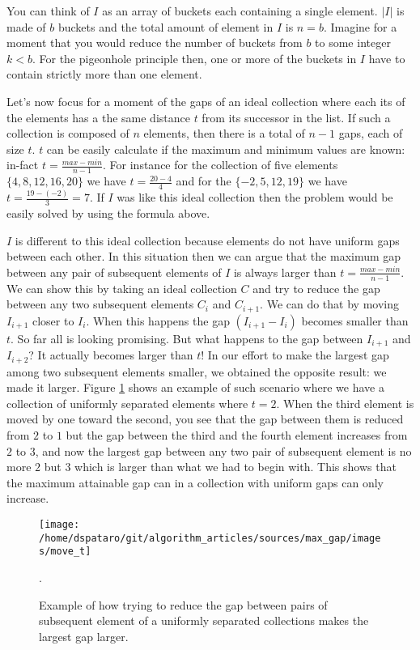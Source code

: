 You can think of $I$ as an array of buckets each containing a single element. $|I|$ is made of $b$
buckets and the total amount of element in $I$ is $n=b$. Imagine for a moment that you would reduce
the number of buckets from $b$ to some integer $k < b$. For the pigeonhole principle then, one or
more of the buckets in $I$ have to contain  strictly more than one element.

Let's now focus for a moment of the gaps of an ideal collection where each its of the elements has a
the same distance $t$ from its successor in the list. If such a collection is composed of  $n$
elements, then there is a total of $n-1$ gaps, each of size $t$. $t$ can be easily calculate if the
maximum and minimum values are known: in-fact $t=\frac{max-min}{n-1}$. For instance for the
collection of five elements $\{4,8,12,16,20\}$ we have $t=\frac{20-4}{4}$ and for the
$\{-2,5,12,19\}$ we have $t=\frac{19- (-2)}{3} = 7$. If $I$ was like this ideal collection then the
problem would be easily solved by using the formula above. 

$I$ is different to this ideal collection because elements do not have uniform gaps between each
other. In this situation then we can argue that the maximum gap between any pair of subsequent
elements of $I$ is always larger than $t=\frac{max-min}{n-1}$. We can show this by taking an ideal
collection $C$ and try to reduce the gap between any two subsequent elements $C_{i}$ and $C_{i+1}$.
We can do that by moving $I_{i+1}$ closer to $I_{i}$. When this happens the gap $(I_{i+1}-I_{i})$
becomes smaller than $t$. So far all is looking promising. But what happens to the gap between
$I_{i+1}$ and $I_{i+2}$? It actually becomes larger than $t$! In our effort to make the largest gap
among two subsequent elements smaller, we obtained the opposite result: we made it larger. Figure
\ref{fig:max_gap:move_t} shows an example of such scenario where we have a collection of uniformly
separated elements where $t  = 2$. When the third element is moved by one toward the second, you see
that the gap between them is reduced from $2$ to $1$ but the gap between the third and the fourth
element increases from $2$ to $3$, and now the largest gap between any two pair of subsequent
element is no more $2$ but $3$ which is larger than what we had to begin with. This shows that the
maximum attainable gap can in a  collection with uniform gaps can only increase. 
\begin{figure}
	\centering
	\texttt{[image: /home/dspataro/git/algorithm\_articles/sources/max\_gap/images/move\_t]}
	\caption{Example of how trying to reduce the gap between pairs of subsequent element of a
	uniformly separated collections makes the largest gap larger.}.
   \label{fig:max_gap:move_t}
\end{figure}


